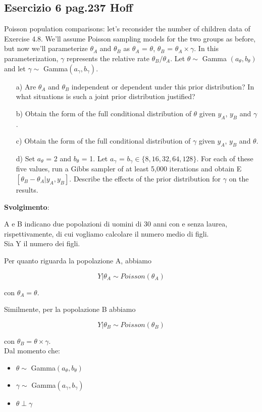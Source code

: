 \subsection{Esercizio 6 pag.237   Hoff}

Poisson population comparisons: let’s reconsider the number of children data of Exercise 4.8. We’ll assume Poisson sampling models for the two
groups as before, but now we’ll parameterize $\theta_{A}$ and $\theta_B$ as $\theta_A$ = $\theta$, $\theta_B$ = $\theta_A \times \gamma$. In this parameterization, $\gamma$ represents the relative rate $\theta_B/\theta_A$. Let $\theta \sim$ Gamma $(a_\theta, b_\theta)$ and let $\gamma \sim$ Gamma$(a_\gamma, b_\gamma)$.
\begin{enumerate}
\item [a)]Are $\theta_A$ and $\theta_B$ independent or dependent under this prior distribution?
In what situations is such a joint prior distribution justified?
\item [b)]Obtain the form of the full conditional distribution of $\theta$ given $y_A$, $y_B$ and $\gamma$.
\item [c)]Obtain the form of the full conditional distribution of $\gamma$ given $y_A$, $y_B$ and $\theta$.
\item [d)]Set $a_\theta$ = 2 and $b_\theta$ = 1. Let $a_\gamma$ = $b_\gamma \in \lbrace 8, 16, 32, 64, 128 \rbrace $. For each of these five values, run a Gibbs sampler of at least 5,000 iterations and obtain E$[\theta_B - \theta_A|y_A, y_B]$. Describe the effects of the prior distribution for $\gamma$ on the results.
\end{enumerate}

\textbf{Svolgimento}:
\bigskip

A e B indicano due popolazioni di uomini di 30 anni con e senza laurea, rispettivamente, di cui vogliamo calcolare il numero medio di figli.\\
Sia Y il numero dei figli.

Per quanto riguarda la popolazione A, abbiamo 

$$Y|\theta_A \sim Poisson (\theta_A)$$

con $\theta_A=\theta$.

Similmente, per la popolazione B abbiamo 

$$Y|\theta_B \sim Poisson(\theta_B)$$ 

con $\theta_B=\theta \times \gamma$.\\

Dal momento che:
\begin{itemize}[-]
\item $\theta \sim$ Gamma$(a_\theta, b_\theta)$
\item $\gamma \sim$ Gamma$(a_\gamma, b_\gamma)$
\item $\theta \perp \gamma$
\end{itemize}

